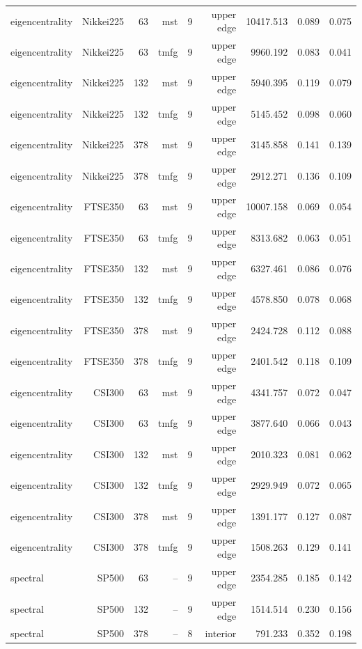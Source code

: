 \begin{tabular}{lrrrrrrrr}
eigencentrality & Nikkei225 & 63 & mst & 9 & upper edge & 10417.513 & 0.089 & 0.075 \\
eigencentrality & Nikkei225 & 63 & tmfg & 9 & upper edge & 9960.192 & 0.083 & 0.041 \\
eigencentrality & Nikkei225 & 132 & mst & 9 & upper edge & 5940.395 & 0.119 & 0.079 \\
eigencentrality & Nikkei225 & 132 & tmfg & 9 & upper edge & 5145.452 & 0.098 & 0.060 \\
eigencentrality & Nikkei225 & 378 & mst & 9 & upper edge & 3145.858 & 0.141 & 0.139 \\
eigencentrality & Nikkei225 & 378 & tmfg & 9 & upper edge & 2912.271 & 0.136 & 0.109 \\
eigencentrality & FTSE350 & 63 & mst & 9 & upper edge & 10007.158 & 0.069 & 0.054 \\
eigencentrality & FTSE350 & 63 & tmfg & 9 & upper edge & 8313.682 & 0.063 & 0.051 \\
eigencentrality & FTSE350 & 132 & mst & 9 & upper edge & 6327.461 & 0.086 & 0.076 \\
eigencentrality & FTSE350 & 132 & tmfg & 9 & upper edge & 4578.850 & 0.078 & 0.068 \\
eigencentrality & FTSE350 & 378 & mst & 9 & upper edge & 2424.728 & 0.112 & 0.088 \\
eigencentrality & FTSE350 & 378 & tmfg & 9 & upper edge & 2401.542 & 0.118 & 0.109 \\
eigencentrality & CSI300 & 63 & mst & 9 & upper edge & 4341.757 & 0.072 & 0.047 \\
eigencentrality & CSI300 & 63 & tmfg & 9 & upper edge & 3877.640 & 0.066 & 0.043 \\
eigencentrality & CSI300 & 132 & mst & 9 & upper edge & 2010.323 & 0.081 & 0.062 \\
eigencentrality & CSI300 & 132 & tmfg & 9 & upper edge & 2929.949 & 0.072 & 0.065 \\
eigencentrality & CSI300 & 378 & mst & 9 & upper edge & 1391.177 & 0.127 & 0.087 \\
eigencentrality & CSI300 & 378 & tmfg & 9 & upper edge & 1508.263 & 0.129 & 0.141 \\
spectral & SP500 & 63 & -- & 9 & upper edge & 2354.285 & 0.185 & 0.142 \\
spectral & SP500 & 132 & -- & 9 & upper edge & 1514.514 & 0.230 & 0.156 \\
spectral & SP500 & 378 & -- & 8 & interior & 791.233 & 0.352 & 0.198 \\

\end{tabular}
